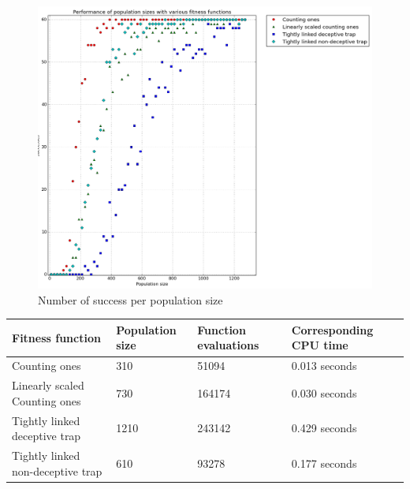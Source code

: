 \documentclass[12pt]{article}
\theoremstyle{definition}
\begin{document}
\begin{figure}[!htb]
    \centering
    \includegraphics[totalheight=0.7\textheight]{images/exp1.png}
    \caption{Number of success per population size}
\label{fig:exp1}
\end{figure}

\begin{table}[!htb]
\begin{adjustwidth}{0cm}{}
\centering
\begin{tabular}{lp{2.5cm}p{2.5cm}p{2.8cm}}
\toprule[1.5pt]
\bf Fitness function & \bf Population size & \bf Function evaluations & \bf Corresponding CPU time\\\midrule
Counting ones & 310 & 51094 & 0.013 seconds \\
Linearly scaled Counting ones & 730 & 164174 & 0.030 seconds \\
Tightly linked deceptive trap & 1210 & 243142 & 0.429 seconds \\
Tightly linked non-deceptive trap & 610 & 93278 & 0.177 seconds \\
\bottomrule[1.25pt]
\end{tabular}\par
\bigskip
{}
\label{tab:exp1}
\end{adjustwidth}
\end{table}

\end{document}
